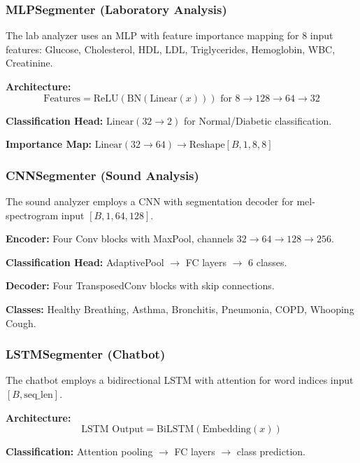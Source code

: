 \documentclass[conference]{IEEEtran}
\begin{document}
\subsubsection{MLPSegmenter (Laboratory Analysis)}

The lab analyzer uses an MLP with feature importance mapping for 8 input features: Glucose, Cholesterol, HDL, LDL, Triglycerides, Hemoglobin, WBC, Creatinine.

\textbf{Architecture:}
\begin{equation}
\text{Features} = \text{ReLU}(\text{BN}(\text{Linear}(x))) \text{ for } 8 \rightarrow 128 \rightarrow 64 \rightarrow 32
\end{equation}

\textbf{Classification Head:} $\text{Linear}(32 \rightarrow 2)$ for Normal/Diabetic classification.

\textbf{Importance Map:} $\text{Linear}(32 \rightarrow 64) \rightarrow \text{Reshape}[B, 1, 8, 8]$

\subsubsection{CNNSegmenter (Sound Analysis)}

The sound analyzer employs a CNN with segmentation decoder for mel-spectrogram input $[B, 1, 64, 128]$.

\textbf{Encoder:} Four Conv blocks with MaxPool, channels $32 \rightarrow 64 \rightarrow 128 \rightarrow 256$.

\textbf{Classification Head:} AdaptivePool $\rightarrow$ FC layers $\rightarrow$ 6 classes.

\textbf{Decoder:} Four TransposedConv blocks with skip connections.

\textbf{Classes:} Healthy Breathing, Asthma, Bronchitis, Pneumonia, COPD, Whooping Cough.

\subsubsection{LSTMSegmenter (Chatbot)}

The chatbot employs a bidirectional LSTM with attention for word indices input $[B, \text{seq\_len}]$.

\textbf{Architecture:}
\begin{equation}
\text{LSTM Output} = \text{BiLSTM}(\text{Embedding}(x))
\end{equation}

\textbf{Classification:} Attention pooling $\rightarrow$ FC layers $\rightarrow$ class prediction.
\end{document}
